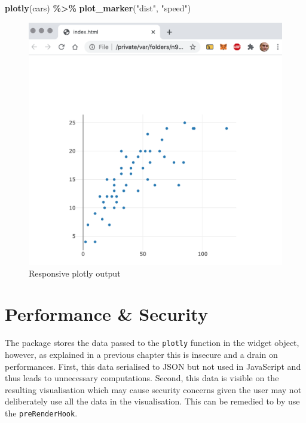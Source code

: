 \documentclass[
]{krantz}
\makeatletter
\newenvironment{Shaded}{\begin{snugshade}}{\end{snugshade}}
\newcommand{\KeywordTok}[1]{\textcolor[rgb]{0.27,0.27,0.27}{\textbf{#1}}}
\newcommand{\NormalTok}[1]{#1}
\newcommand{\OperatorTok}[1]{\textcolor[rgb]{0.43,0.43,0.43}{\textbf{#1}}}
\newcommand{\StringTok}[1]{\textcolor[rgb]{0.5,0.5,0.5}{#1}}
\newenvironment{kframe}{%
\medskip{}
\setlength{\fboxsep}{.8em}
 \def\at@end@of@kframe{}%
 \ifinner\ifhmode%
  \def\at@end@of@kframe{\end{minipage}}%
  \begin{minipage}{\columnwidth}%
 \fi\fi%
 \def\FrameCommand##1{\hskip\@totalleftmargin \hskip-\fboxsep
 \colorbox{shadecolor}{##1}\hskip-\fboxsep
     \hskip-\linewidth \hskip-\@totalleftmargin \hskip\columnwidth}%
 \MakeFramed {\advance\hsize-\width
   \@totalleftmargin\z@ \linewidth\hsize
   \@setminipage}}%
 {\par\unskip\endMakeFramed%
 \at@end@of@kframe}
\renewenvironment{Shaded}{\begin{kframe}}{\end{kframe}}
\makeatother
\begin{document}
\begin{Shaded}
\begin{Highlighting}[]
\KeywordTok{plotly}\NormalTok{(cars) }\OperatorTok{\%\textgreater{}\%}\StringTok{  }
\StringTok{      }\KeywordTok{plot\_marker}\NormalTok{(}\StringTok{"dist"}\NormalTok{, }\StringTok{"speed"}\NormalTok{)}
\end{Highlighting}
\end{Shaded}

\begin{figure}
\centering
\includegraphics{images/plotlier-responsive.png}
\caption{Responsive plotly output}
\end{figure}

\hypertarget{widgets-ex-plotly-perf-security}{%
\section{Performance \& Security}\label{widgets-ex-plotly-perf-security}}

The package stores the data passed to the \texttt{plotly} function in the widget object, however, as explained in a previous chapter this is insecure and a drain on performances. First, this data serialised to JSON but not used in JavaScript and thus leads to unnecessary computations. Second, this data is visible on the resulting visualisation which may cause security concerns given the user may not deliberately use all the data in the visualisation. This can be remedied to by use the \texttt{preRenderHook}.
\end{document}
